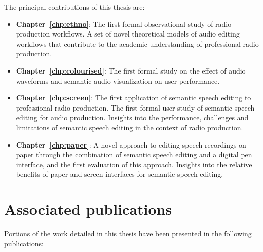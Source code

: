 

The principal contributions of this thesis are:
\begin{itemize}
  \item \textbf{Chapter~\ref{chp:ethno}}: 
    The first formal observational study of radio production workflows. A set of novel theoretical models of audio
    editing workflows that contribute to the academic understanding of professional radio production.
  \item \textbf{Chapter~\ref{chp:colourised}}: 
    The first formal study on the effect of audio waveforms and semantic audio visualization on user performance.
  \item \textbf{Chapter~\ref{chp:screen}}: 
    The first application of semantic speech editing to professional radio production.  The first formal user study of
    semantic speech editing for audio production. Insights into the performance, challenges and limitations of semantic
    speech editing in the context of radio production. 
  \item \textbf{Chapter~\ref{chp:paper}}:
    A novel approach to editing speech recordings on paper through the combination of semantic speech editing and a
    digital pen interface, and the first evaluation of this approach. Insights into the relative benefits of paper and
    screen interfaces for semantic speech editing.
\end{itemize}

\section{Associated publications}\label{sec:intro-publications}

Portions of the work detailed in this thesis have been presented in the following publications:

